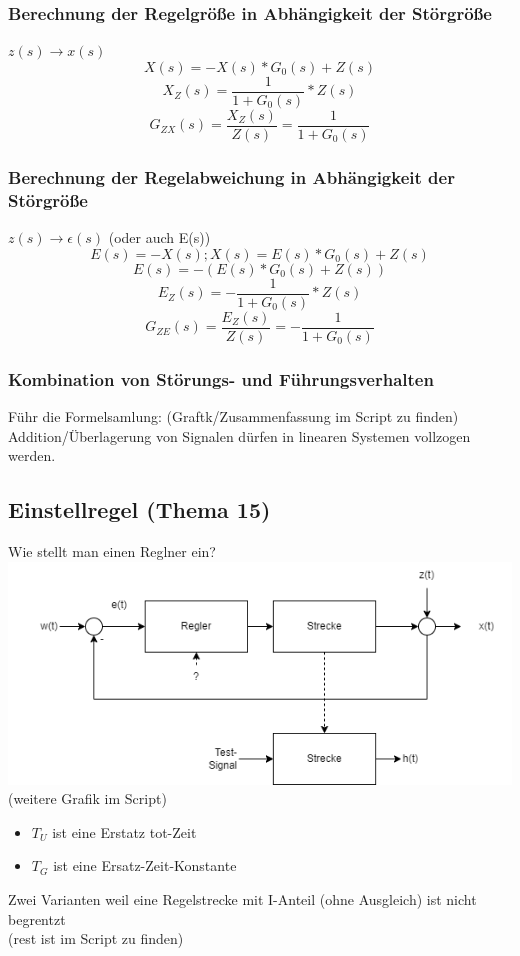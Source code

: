\documentclass[a4paper, twoside, 11pt]{article}
\begin{document}
\subsubsection*{Berechnung der Regelgröße in Abhängigkeit der Störgröße}
$z(s) \rightarrow x(s)$
\[ X(s)=-X(s)*G_0(s)+Z(s) \]
\[ X_Z(s)=\frac{1}{1+G_0(s)}*Z(s) \]
\[ G_{ZX}(s)=\frac{X_Z(s)}{Z(s)}=\frac{1}{1+G_0(s)} \]

\subsubsection*{Berechnung der Regelabweichung in Abhängigkeit der Störgröße}
$z(s) \rightarrow \epsilon(s)$ (oder auch E(s))
\[ E(s)=-X(s); X(s) = E(s) * G_0(s)+Z(s) \]
\[ E(s)=-(E(s)*G_0(s)+Z(s)) \]
\[ E_Z(s)=-\frac{1}{1+G_0(s)}*Z(s) \]
\[ G_{ZE}(s)=\frac{E_Z(s)}{Z(s)}=-\frac{1}{1+G_0(s)} \]

\subsubsection*{Kombination von Störungs- und Führungsverhalten}
Führ die Formelsamlung: (Graftk/Zusammenfassung im Script zu finden) \\
Addition/Überlagerung von Signalen dürfen in linearen Systemen vollzogen werden.


\subsection*{Einstellregel (Thema 15)}
Wie stellt man einen Reglner ein? \\
\includegraphics[width=\textwidth]{2024_11_21_Wie_stelle_ich_einen_Regler_ein.png}
(weitere Grafik im Script)\\
\begin{itemize}
	\item $T_U$ ist eine Erstatz tot-Zeit
	\item $T_G$ ist eine Ersatz-Zeit-Konstante
\end{itemize}
Zwei Varianten weil eine Regelstrecke mit I-Anteil (ohne Ausgleich) ist nicht begrentzt \\
(rest ist im Script zu finden)
\end{document}
